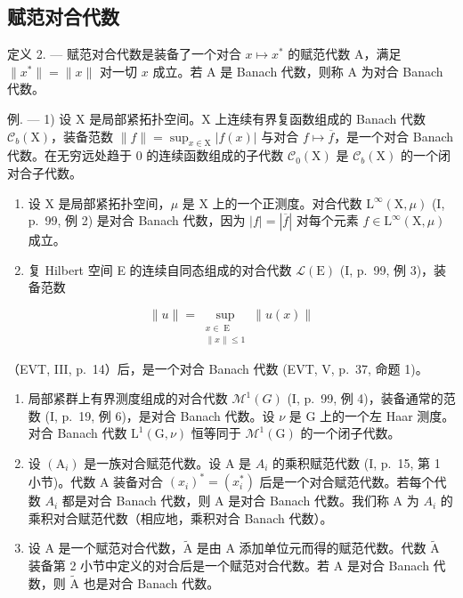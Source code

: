 \subsection{赋范对合代数}

定义 2. --- 赋范对合代数是装备了一个对合 \(x \mapsto x^{*}\) 的赋范代数 A，满足 \(\|x^{*}\| = \|x\|\) 对一切 \(x\) 成立。若 A 是 Banach 代数，则称 A 为对合 Banach 代数。

例. --- 1) 设 X 是局部紧拓扑空间。X 上连续有界复函数组成的 Banach 代数 \(\mathcal{C}_{b}(\mathrm{X})\)，装备范数 \(\|f\| = \sup_{x\in\mathrm{X}}|f(x)|\) 与对合 \(f\mapsto\overline{f}\)，是一个对合 Banach 代数。在无穷远处趋于 0 的连续函数组成的子代数 \(\mathcal{C}_{0}(\mathrm{X})\) 是 \(\mathcal{C}_{b}(\mathrm{X})\) 的一个闭对合子代数。

\begin{enumerate}
\def\labelenumi{\arabic{enumi})}
\setcounter{enumi}{1}
\item
  设 X 是局部紧拓扑空间，\(\mu\) 是 X 上的一个正测度。对合代数 \(\mathrm{L}^{\infty}(\mathrm{X},\mu)\) (I, p.~99, 例 2) 是对合 Banach 代数，因为 \(|f| = |\overline{f}|\) 对每个元素 \(f \in \mathrm{L}^{\infty}(\mathrm{X},\mu)\) 成立。
\item
  复 Hilbert 空间 E 的连续自同态组成的对合代数 \(\mathcal{L}(\mathrm{E})\) (I, p.~99, 例 3)，装备范数
\end{enumerate}

\[
\| u\| = \sup_{\substack{x\in \operatorname{E}\\ \| x\| \leqslant 1}}\| u(x)\|
\]

（EVT, III, p.~14）后，是一个对合 Banach 代数 (EVT, V, p.~37, 命题 1)。

\begin{enumerate}
\def\labelenumi{\arabic{enumi})}
\setcounter{enumi}{3}
\item
  局部紧群上有界测度组成的对合代数 \(\mathcal{M}^{1}(G)\) (I, p.~99, 例 4)，装备通常的范数 (I, p.~19, 例 6)，是对合 Banach 代数。设 \(\nu\) 是 G 上的一个左 Haar 测度。对合 Banach 代数 \(\mathrm{L}^{1}(\mathrm{G},\nu)\) 恒等同于 \(\mathcal{M}^{1}(\mathrm{G})\) 的一个闭子代数。
\item
  设 \((\mathrm{A}_{i})\) 是一族对合赋范代数。设 A 是 \(A_{i}\) 的乘积赋范代数 (I, p.~15, 第 1 小节)。代数 A 装备对合 \((x_{i})^{*} = (x_{i}^{*})\) 后是一个对合赋范代数。若每个代数 \(A_{i}\) 都是对合 Banach 代数，则 A 是对合 Banach 代数。我们称 A 为 \(A_{i}\) 的乘积对合赋范代数（相应地，乘积对合 Banach 代数）。
\item
  设 A 是一个赋范对合代数，\(\widetilde{\mathrm{A}}\) 是由 A 添加单位元而得的赋范代数。代数 \(\widetilde{\mathrm{A}}\) 装备第 2 小节中定义的对合后是一个赋范对合代数。若 A 是对合 Banach 代数，则 \(\widetilde{\mathrm{A}}\) 也是对合 Banach 代数。
\end{enumerate}

